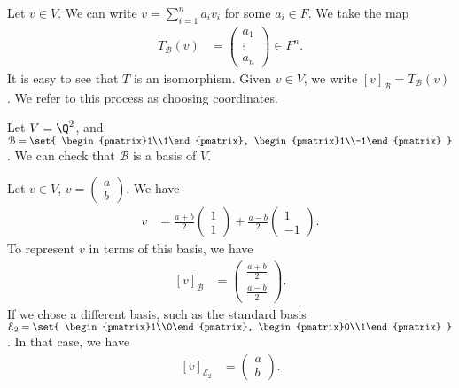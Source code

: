 \documentclass[10pt]{mypackage}
\begin{document}
Let $v\in V$. We can write $v = \sum_{i=1}^{n}a_iv_i$ for some $a_i\in F$. We take the map
\begin{align*}
  T_{\mathcal{B}}\left(v\right) &= \begin{pmatrix}a_1\\\vdots\\a_n\end{pmatrix}\in F^n.
\end{align*}
It is easy to see that $T$ is an isomorphism. Given $v\in V$, we write $\left[v\right]_{\mathcal{B}} = T_{\mathcal{B}}\left(v\right)$. We refer to this process as choosing coordinates.
\begin{example}
  Let $V = \Q^2$, and $\mathcal{B} = \set{ \begin{pmatrix}1\\1\end{pmatrix}, \begin{pmatrix}1\\-1\end{pmatrix} }$. We can check that $\mathcal{B}$ is a basis of $V$.\newline

  Let $v\in V$, $v = \begin{pmatrix}a\\b\end{pmatrix}$. We have
  \begin{align*}
    v &= \frac{a+b}{2} \begin{pmatrix}1\\1\end{pmatrix} + \frac{a-b}{2} \begin{pmatrix}1\\-1\end{pmatrix}.
  \end{align*}
  To represent $v$ in terms of this basis, we have
  \begin{align*}
    \left[v\right]_{\mathcal{B}} &= \begin{pmatrix}\frac{a+b}{2}\\\frac{a-b}{2}\end{pmatrix}.
  \end{align*}
  If we chose a different basis, such as the standard basis $\mathcal{E}_2 = \set{ \begin{pmatrix}1\\0\end{pmatrix}, \begin{pmatrix}0\\1\end{pmatrix} }$. In that case, we have
  \begin{align*}
    \left[v\right]_{\mathcal{E}_2} &= \begin{pmatrix}a\\b\end{pmatrix}.
  \end{align*}
\end{example}
\end{document}
